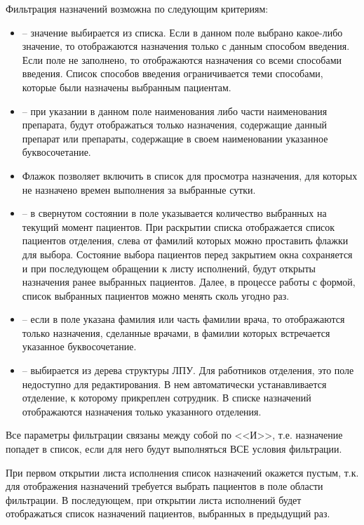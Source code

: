 Фильтрация назначений возможна по следующим критериям:
\begin{itemize}
 \item {} – значение выбирается из списка. Если в данном поле выбрано какое-либо значение, то отображаются назначения только с данным способом введения. Если поле  не заполнено, то отображаются назначения со всеми способами введения. Список способов введения ограничивается теми способами, которые были назначены выбранным пациентам.
 \item {} – при указании в данном поле наименования либо части наименования препарата, будут отображаться только назначения, содержащие данный препарат или препараты, содержащие в своем наименовании указанное буквосочетание.
 \item Флажок  позволяет включить в список для просмотра назначения, для которых не назначено времен выполнения за выбранные сутки.
 \item {} – в свернутом состоянии в поле указывается количество выбранных на текущий момент пациентов. При раскрытии списка отображается список пациентов отделения, слева от фамилий которых можно проставить флажки для выбора. Состояние выбора пациентов перед закрытием окна  сохраняется и при последующем обращении к листу исполнений, будут открыты назначения ранее выбранных пациентов. Далее, в процессе работы с формой, список выбранных пациентов можно менять сколь угодно раз.
 \item {} – если в поле указана фамилия или часть фамилии врача, то отображаются только назначения, сделанные врачами, в фамилии которых встречается указанное буквосочетание.
 \item {} – выбирается из дерева структуры ЛПУ. Для работников отделения, это поле недоступно для редактирования. В нем автоматически устанавливается отделение, к которому прикреплен сотрудник. В списке назначений отображаются назначения только указанного отделения.
\end{itemize}
 
Все параметры фильтрации связаны между собой по <<И>>, т.е. назначение попадет в список, если для него будут выполняться ВСЕ условия фильтрации.

При первом открытии листа исполнения список назначений окажется пустым, т.к. для отображения назначений требуется выбрать пациентов в поле  области фильтрации. В последующем, при открытии листа исполнений будет отображаться список назначений пациентов, выбранных в предыдущий раз.

